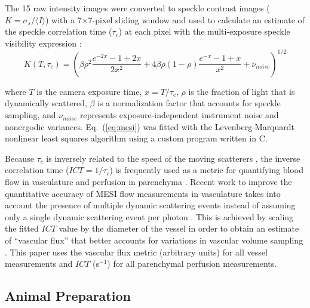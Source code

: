 \documentclass[review]{elsarticle}
\begin{document}
The 15 raw intensity images were converted to speckle contrast images ($K = \sigma_{s} / {\langle{I}\rangle}$) with a 7$\times$7-pixel sliding window and used to calculate an estimate of the speckle correlation time ($\tau_c$) at each pixel with the multi-exposure speckle visibility expression \cite{Parthasarathy:2008el}:
%
\begin{equation}
    \label{eq:mesi}
    K(T,\tau_c) =
        \left(
        \beta\rho^2\frac{e^{-2x} - 1 + 2x}{2x^2} +
        4\beta\rho(1 - \rho)\frac{e^{-x} - 1 + x}{x^2} +
        \nu_{noise}
        \right)^{1/2}
\end{equation}

\noindent where $T$ is the camera exposure time, $x = T/\tau_c$, $\rho$ is the fraction of light that is dynamically scattered, $\beta$ is a normalization factor that accounts for speckle sampling, and $\nu_{noise}$ represents exposure-independent instrument noise and nonergodic variances. Eq.~(\ref{eq:mesi}) was fitted with the Levenberg-Marquardt nonlinear least squares algorithm \cite{Lourakis:J2fCMU5i} using a custom program written in C.

Because $\tau_c$ is inversely related to the speed of the moving scatterers \cite{Bonner:1981hg,Briers:1996kfa}, the inverse correlation time ($ICT = 1/\tau_c$) is frequently used as a metric for quantifying blood flow in vasculature and perfusion in parenchyma \cite{Ayata:2004ba,Strong:2005kj,Sullender:2018ff}. Recent work to improve the quantitative accuracy of MESI flow measurements in vasculature takes into account the presence of multiple dynamic scattering events instead of assuming only a single dynamic scattering event per photon \cite{Kazmi:2015du}. This is achieved by scaling the fitted $ICT$ value by the diameter of the vessel in order to obtain an estimate of ``vascular flux'' that better accounts for variations in vascular volume sampling \cite{Kazmi:2015du,Richards:2017df}. This paper uses the vascular flux metric (arbitrary units) for all vessel measurements and $ICT$ (s$^{-1}$) for all parenchymal perfusion measurements.



\subsection{Animal Preparation}
\end{document}
